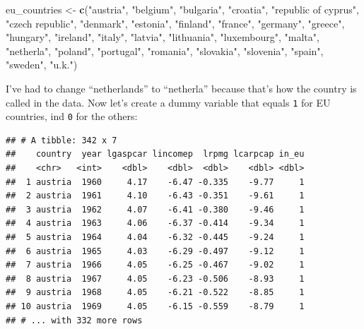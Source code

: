 \documentclass[]{gitbook}
\newenvironment{Shaded}{\begin{snugshade}}{\end{snugshade}}
\newcommand{\DataTypeTok}[1]{\textcolor[rgb]{0.13,0.29,0.53}{#1}}
\newcommand{\DecValTok}[1]{\textcolor[rgb]{0.00,0.00,0.81}{#1}}
\newcommand{\KeywordTok}[1]{\textcolor[rgb]{0.13,0.29,0.53}{\textbf{#1}}}
\newcommand{\NormalTok}[1]{#1}
\newcommand{\OperatorTok}[1]{\textcolor[rgb]{0.81,0.36,0.00}{\textbf{#1}}}
\newcommand{\StringTok}[1]{\textcolor[rgb]{0.31,0.60,0.02}{#1}}
\theoremstyle{definition}
\theoremstyle{definition}
\theoremstyle{definition}
\theoremstyle{remark}
\begin{document}
\begin{Shaded}
\begin{Highlighting}[]
\NormalTok{eu_countries <-}\StringTok{ }\KeywordTok{c}\NormalTok{(}\StringTok{"austria"}\NormalTok{, }\StringTok{"belgium"}\NormalTok{, }\StringTok{"bulgaria"}\NormalTok{, }\StringTok{"croatia"}\NormalTok{, }\StringTok{"republic of cyprus"}\NormalTok{,}
                  \StringTok{"czech republic"}\NormalTok{, }\StringTok{"denmark"}\NormalTok{, }\StringTok{"estonia"}\NormalTok{, }\StringTok{"finland"}\NormalTok{, }\StringTok{"france"}\NormalTok{, }\StringTok{"germany"}\NormalTok{,}
                  \StringTok{"greece"}\NormalTok{, }\StringTok{"hungary"}\NormalTok{, }\StringTok{"ireland"}\NormalTok{, }\StringTok{"italy"}\NormalTok{, }\StringTok{"latvia"}\NormalTok{, }\StringTok{"lithuania"}\NormalTok{, }\StringTok{"luxembourg"}\NormalTok{,}
                  \StringTok{"malta"}\NormalTok{, }\StringTok{"netherla"}\NormalTok{, }\StringTok{"poland"}\NormalTok{, }\StringTok{"portugal"}\NormalTok{, }\StringTok{"romania"}\NormalTok{, }\StringTok{"slovakia"}\NormalTok{, }\StringTok{"slovenia"}\NormalTok{,}
                  \StringTok{"spain"}\NormalTok{, }\StringTok{"sweden"}\NormalTok{, }\StringTok{"u.k."}\NormalTok{)}
\end{Highlighting}
\end{Shaded}

I've had to change ``netherlands'' to ``netherla'' because that's how
the country is called in the data. Now let's create a dummy variable
that equals \texttt{1} for EU countries, ind \texttt{0} for the others:

\begin{Shaded}
\end{Shaded}

\begin{verbatim}
## # A tibble: 342 x 7
##    country  year lgaspcar lincomep  lrpmg lcarpcap in_eu
##    <chr>   <int>    <dbl>    <dbl>  <dbl>    <dbl> <dbl>
##  1 austria  1960     4.17    -6.47 -0.335    -9.77     1
##  2 austria  1961     4.10    -6.43 -0.351    -9.61     1
##  3 austria  1962     4.07    -6.41 -0.380    -9.46     1
##  4 austria  1963     4.06    -6.37 -0.414    -9.34     1
##  5 austria  1964     4.04    -6.32 -0.445    -9.24     1
##  6 austria  1965     4.03    -6.29 -0.497    -9.12     1
##  7 austria  1966     4.05    -6.25 -0.467    -9.02     1
##  8 austria  1967     4.05    -6.23 -0.506    -8.93     1
##  9 austria  1968     4.05    -6.21 -0.522    -8.85     1
## 10 austria  1969     4.05    -6.15 -0.559    -8.79     1
## # ... with 332 more rows
\end{verbatim}
\end{document}
